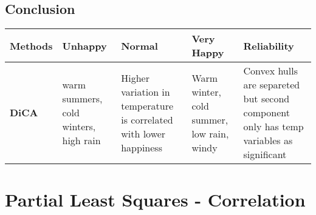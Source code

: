 \documentclass[]{book}
\begin{document}
\hypertarget{conclusion-3}{%
\section{Conclusion}\label{conclusion-3}}

\begin{longtable}[]{@{}lllll@{}}
\toprule
\begin{minipage}[b]{0.15\columnwidth}\raggedright
\textbf{Methods}\strut
\end{minipage} & \begin{minipage}[b]{0.20\columnwidth}\raggedright
\textbf{Unhappy}\strut
\end{minipage} & \begin{minipage}[b]{0.19\columnwidth}\raggedright
\textbf{Normal}\strut
\end{minipage} & \begin{minipage}[b]{0.22\columnwidth}\raggedright
\textbf{Very Happy}\strut
\end{minipage} & \begin{minipage}[b]{0.10\columnwidth}\raggedright
\textbf{Reliability}\strut
\end{minipage}\tabularnewline
\midrule
\endhead
\begin{minipage}[t]{0.15\columnwidth}\raggedright
\textbf{DiCA}\strut
\end{minipage} & \begin{minipage}[t]{0.20\columnwidth}\raggedright
warm summers, cold winters, high rain\strut
\end{minipage} & \begin{minipage}[t]{0.19\columnwidth}\raggedright
Higher variation in temperature is correlated with lower happiness\strut
\end{minipage} & \begin{minipage}[t]{0.22\columnwidth}\raggedright
Warm winter, cold summer, low rain, windy\strut
\end{minipage} & \begin{minipage}[t]{0.10\columnwidth}\raggedright
Convex hulls are separeted but second component only has temp variables
as significant\strut
\end{minipage}\tabularnewline
\bottomrule
\end{longtable}

\hypertarget{partial-least-squares---correlation}{%
\chapter{Partial Least Squares -
Correlation}\label{partial-least-squares---correlation}}
\end{document}
